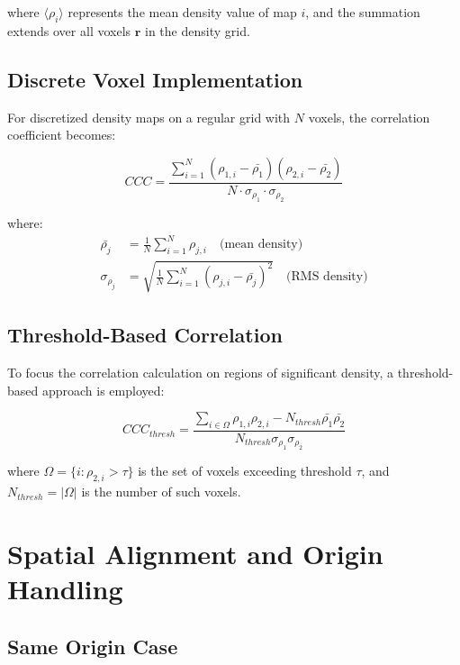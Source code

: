 \documentclass[12pt,a4paper]{article}
\begin{document}
where $\langle\rho_i\rangle$ represents the mean density value 
of map $i$, and the summation extends over all voxels $\mathbf{r}$ 
in the density grid.

\subsection{Discrete Voxel Implementation}

For discretized density maps on a regular grid with $N$ voxels, 
the correlation coefficient becomes:

\begin{equation}
CCC = \frac{\sum_{i=1}^{N} (\rho_{1,i} - \bar{\rho_1})(\rho_{2,i} - \bar{\rho_2})}{N \cdot \sigma_{\rho_1} \cdot \sigma_{\rho_2}}
\end{equation}

where:
\begin{align}
\bar{\rho_j} &= \frac{1}{N}\sum_{i=1}^{N} \rho_{j,i} \quad \text{(mean density)} \\
\sigma_{\rho_j} &= \sqrt{\frac{1}{N}\sum_{i=1}^{N} (\rho_{j,i} - \bar{\rho_j})^2} \quad \text{(RMS density)}
\end{align}

\subsection{Threshold-Based Correlation}

To focus the correlation calculation on regions of significant 
density, a threshold-based approach is employed:

\begin{equation}
CCC_{thresh} = \frac{\sum_{i \in \Omega} \rho_{1,i} \rho_{2,i} - N_{thresh} \bar{\rho_1} \bar{\rho_2}}{N_{thresh} \sigma_{\rho_1} \sigma_{\rho_2}}
\end{equation}

where $\Omega = \{i : \rho_{2,i} > \tau\}$ is the set of voxels 
exceeding threshold $\tau$, and $N_{thresh} = |\Omega|$ is the 
number of such voxels.

\section{Spatial Alignment and Origin Handling}

\subsection{Same Origin Case}
\end{document}

